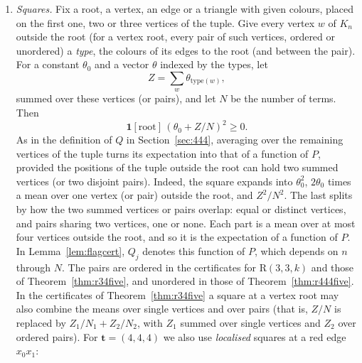 \documentclass[11pt]{article}
\theoremstyle{spacedplain}
\theoremstyle{spaceddef}
\theoremstyle{spacedremark}
\newcommand{\R}{\mathrm{R}}
\newcommand{\bt}{\mathbf{t}}
\begin{document}
\begin{enumerate}[label=(\alph*)]
\begin{itemize}
\begin{itemize}
\item the \emph{lower floor row} $-g$, with $\beta(\mathbf d)=-2\big\lceil d_i\max\big(0,d_i-1-\sum_{j'\ne j}C_{ij'}\big)/2\big\rceil/((n-1)(n-2))$, as each $u\in N_i(v)$ has at least $d_i-1-\sum_{j'\ne j}C_{ij'}$ colour-$j$ neighbours in $N_i(v)$;
\item the \emph{recursive row}, minus the indicator that $x_0x_1$ and $x_0x_2$ are green and $x_1x_2$ is red or blue, with $\beta(\mathbf d)=-2m_{k-1}(d_3)/((n-1)(n-2))$, by the valid lower bound $e_H(N_3(v))\ge m_{k-1}(d_3(v))$ from the proof of Lemma~\ref{lem:density}.
\end{itemize}
\end{itemize}
For cap and lower rows put $\beta=0$.

\item \emph{Squares.}
Fix a root, a vertex, an edge or a triangle with given colours, placed on the first one, two or three vertices of the tuple.
Give every vertex $w$ of $K_n$ outside the root (for a vertex root, every pair of such vertices, ordered or unordered) a \emph{type}, the colours of its edges to the root (and between the pair).
For a constant $\theta_0$ and a vector $\theta$ indexed by the types, let
\[
Z=\sum_w\theta_{\mathrm{type}(w)},
\]
summed over these vertices (or pairs), and let $N$ be the number of terms.
Then
\[
\mathbf 1[\text{root}]\,(\theta_0+Z/N)^2\ge 0.
\]
As in the definition of $Q$ in Section~\ref{sec:444}, averaging over the remaining vertices of the tuple turns its expectation into that of a function of $P$, provided the positions of the tuple outside the root can hold two summed vertices (or two disjoint pairs).
Indeed, the square expands into $\theta_0^2$, $2\theta_0$ times a mean over one vertex (or pair) outside the root, and $Z^2/N^2$.
The last splits by how the two summed vertices or pairs overlap: equal or distinct vertices, and pairs sharing two vertices, one or none.
Each part is a mean over at most four vertices outside the root, and so it is the expectation of a function of $P$.
In Lemma~\ref{lem:flagcert}, $Q_j$ denotes this function of $P$, which depends on $n$ through $N$.
The pairs are ordered in the certificates for $\R(3,3,k)$ and those of Theorem~\ref{thm:r34five}, and unordered in those of Theorem~\ref{thm:r444five}.
In the certificates of Theorem~\ref{thm:r34five} a square at a vertex root may also combine the means over single vertices and over pairs (that is, $Z/N$ is replaced by $Z_1/N_1+Z_2/N_2$, with $Z_1$ summed over single vertices and $Z_2$ over ordered pairs).
For $\bt=(4,4,4)$ we also use \emph{localised} squares at a red edge $x_0x_1$:

\end{enumerate}
\end{document}
